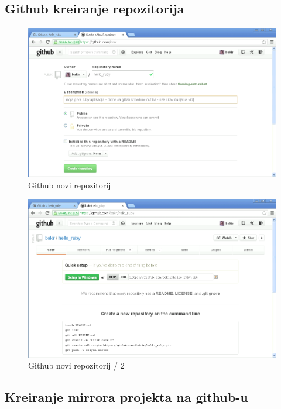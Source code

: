 \documentclass[times, utf8, seminar]{fit}
\begin{document}
\subsection{Github kreiranje repozitorija}

\begin{figure}[H]
\centering
\includegraphics[width=15cm]{img/github_new_repos.png}
\caption{Github novi repozitorij}
\end{figure}

\begin{figure}[H]
\centering
\includegraphics[width=15cm]{img/github_new_repos_2.png}
\caption{Github novi repozitorij / 2}
\end{figure}

\subsection{Kreiranje mirrora projekta na github-u}
\end{document}
